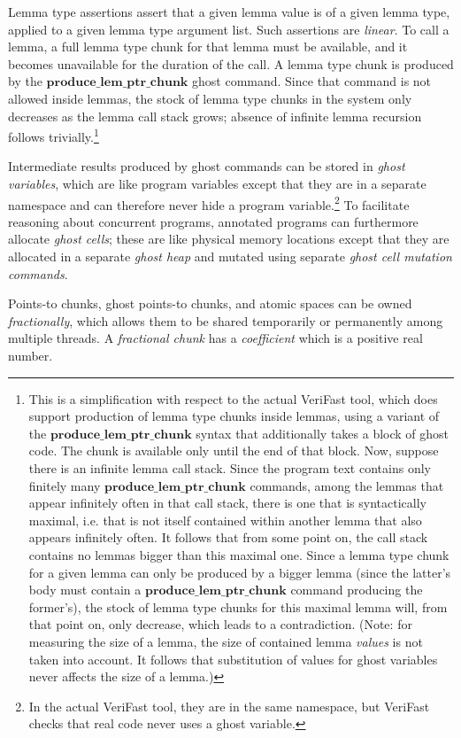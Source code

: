 \documentclass{article}
\begin{document}
Lemma type assertions assert that a given lemma value is of a given lemma type, applied to a given lemma type argument list. Such assertions are \emph{linear}. To call a lemma, a full lemma type chunk for that lemma must be available, and it becomes unavailable for the duration of the call. A lemma type chunk is produced by the $\mathbf{produce\_lem\_ptr\_chunk}$ ghost command. Since that command is not allowed inside lemmas, the stock of lemma type chunks in the system only decreases as the lemma call stack grows; absence of infinite lemma recursion follows trivially.\footnote{This is a simplification with respect to the actual VeriFast tool, which does support production of lemma type chunks inside lemmas, using a variant of the $\mathbf{produce\_lem\_ptr\_chunk}$ syntax that additionally takes a block of ghost code. The chunk is available only until the end of that block. Now, suppose there is an infinite lemma call stack. Since the program text contains only finitely many $\mathbf{produce\_lem\_ptr\_chunk}$ commands, among the lemmas that appear infinitely often in that call stack, there is one that is syntactically maximal, i.e. that is not itself contained within another lemma that also appears infinitely often. It follows that from some point on, the call stack contains no lemmas bigger than this maximal one. Since a lemma type chunk for a given lemma can only be produced by a bigger lemma (since the latter's body must contain a $\mathbf{produce\_lem\_ptr\_chunk}$ command producing the former's), the stock of lemma type chunks for this maximal lemma will, from that point on, only decrease, which leads to a contradiction. (Note: for measuring the size of a lemma, the size of contained lemma \emph{values} is not taken into account. It follows that substitution of values for ghost variables never affects the size of a lemma.)}

Intermediate results produced by ghost commands can be stored in \emph{ghost variables}, which are like program variables except that they are in a separate namespace and can therefore never hide a program variable.\footnote{In the actual VeriFast tool, they are in the same namespace, but VeriFast checks that real code never uses a ghost variable.} To facilitate reasoning about concurrent programs, annotated programs can furthermore allocate \emph{ghost cells}; these are like physical memory locations except that they are allocated in a separate \emph{ghost heap} and mutated using separate \emph{ghost cell mutation commands}.

Points-to chunks, ghost points-to chunks, and atomic spaces can be owned \emph{fractionally}, which allows them to be shared temporarily or permanently among multiple threads. A \emph{fractional chunk} has a \emph{coefficient} which is a positive real number.
\end{document}
